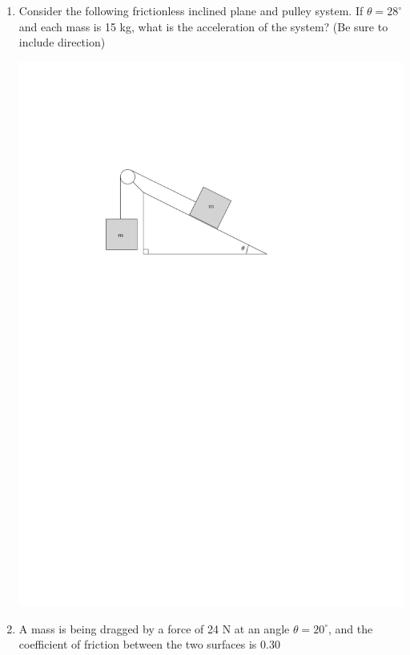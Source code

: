 \documentclass[12pt]{report}
\begin{document}
\begin{enumerate}
\vspace{4cm}

\item Consider the following frictionless inclined plane and pulley system.  If $\theta = 28^\circ$ and each mass is 15 kg, what is the acceleration of the system?  (Be sure to include direction)

\vspace{1cm}

\includegraphics{inclinedPulley} \\
\pagebreak
\item A mass is being dragged by a force of 24 N at an angle $\theta = 20^\circ$, and the coefficient of friction between the two surfaces is 0.30 \\

\end{enumerate}
\end{document}
